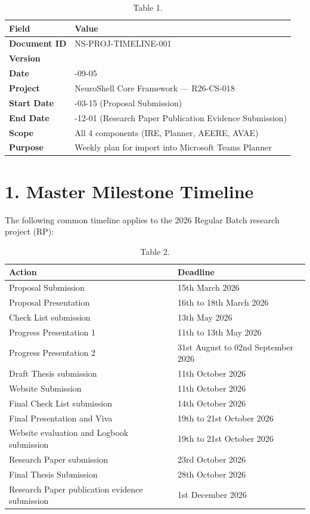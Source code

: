 \documentclass[10pt,journal,onecolumn]{IEEEtran}
\begin{document}
\begin{table}[h]
\caption{Table 1.}
\label{tab:t1}
\begin{tabularx}{\columnwidth}{l >{\raggedright\arraybackslash}X}
\toprule
\textbf{Field} & \textbf{Value}\\
\midrule
\textbf{Document ID} & NS-PROJ-TIMELINE-001\\
\textbf{Version} & 1.0\\
\textbf{Date} & 2026-09-05\\
\textbf{Project} & NeuroShell Core Framework --- R26-CS-018\\
\textbf{Start Date} & 2026-03-15 (Proposal Submission)\\
\textbf{End Date} & 2026-12-01 (Research Paper Publication Evidence Submission)\\
\textbf{Scope} & All 4 components (IRE, Planner, AEERE, AVAE)\\
\textbf{Purpose} & Weekly plan for import into Microsoft Teams Planner\\
\bottomrule
\end{tabularx}
\end{table}

\section{1. Master Milestone Timeline}

The following common timeline applies to the 2026 Regular Batch research project (RP):

\begin{table}[h]
\caption{Table 2.}
\label{tab:t2}
\begin{tabularx}{\columnwidth}{l >{\raggedright\arraybackslash}X}
\toprule
\textbf{Action} & \textbf{Deadline}\\
\midrule
Proposal Submission & 15th March 2026\\
Proposal Presentation & 16th to 18th March 2026\\
Check List submission & 13th May 2026\\
Progress Presentation 1 & 11th to 13th May 2026\\
Progress Presentation 2 & 31st August to 02nd September 2026\\
Draft Thesis submission & 11th October 2026\\
Website Submission & 11th October 2026\\
Final Check List submission & 14th October 2026\\
Final Presentation and Viva & 19th to 21st October 2026\\
Website evaluation and Logbook submission & 19th to 21st October 2026\\
Research Paper submission & 23rd October 2026\\
Final Thesis Submission & 28th October 2026\\
Research Paper publication evidence submission & 1st December 2026\\
\bottomrule
\end{tabularx}
\end{table}
\end{document}
